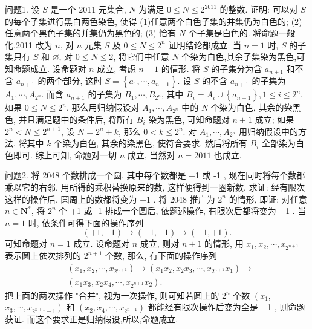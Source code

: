 
问题1. 设 $S$ 是一个 2011 元集合, $N$ 为满足 $0 \leqslant N \leqslant 2^{2011}$ 的整数.
证明: 可以对 $S$ 的每个子集进行黑白两色染色, 使得
(1)任意两个白色子集的并集仍为白色的;
(2)任意两个黑色子集的并集仍为黑色的;
(3) 恰有 $N$ 个子集是白色的.
将命题一般化,2011 改为 $n$, 对 $n$ 元集 $S$ 及 $0 \leqslant N \leqslant 2^n$ 证明结论都成立.
当 $n=1$ 时, $S$ 的子集只有 $S$ 和 $\varnothing$, 对 $0 \leqslant N \leqslant 2$, 将它们中任意 $N$ 个染为白色,其余子集染为黑色,可知命题成立.
设命题对 $n$ 成立, 考虑 $n+1$ 的情形.
将 $S$ 的子集分为含 $a_{n+1}$ 和不含 $a_{n+1}$ 的两个部分, 这时 $S=\left\{a_1, \cdots, a_{n+1}\right\}$. 设 $S$ 的不含 $a_{n+1}$ 的子集为 $A_1, \cdots, A_{2^n}$. 而含 $a_{n+1}$ 的子集为 $B_1, \cdots, B_{2^n}$, 其中 $B_i=A_i \cup\left\{a_{n+1}\right\}, 1 \leqslant i \leqslant 2^n$.
如果 $0 \leqslant N \leqslant 2^n$, 那么用归纳假设对 $A_1, \cdots, A_{2^n}$ 中的 $N$ 个染为白色, 其余的染黑色, 并且满足题中的条件后, 将所有 $B_i$ 染为黑色, 可知命题对 $n+1$ 成立; 如果 $2^n<N \leqslant 2^{n+1}$, 设 $N=2^n+k$, 那么 $0<k \leqslant 2^n$. 对 $A_1, \cdots, A_{2^n}$ 用归纳假设中的方法, 将其中 $k$ 个染为白色, 其余的染黑色, 使符合要求.
然后将所有 $B_i$ 全部染为白色即可.
综上可知, 命题对一切 $n$ 成立, 当然对 $n=2011$ 也成立.



问题2. 将 2048 个数排成一个圆, 其中每个数都是 +1 或 -1 , 现在同时将每个数都乘以它的右邻, 用所得的乘积替换原来的数, 这样便得到一圈新数.
求证: 经有限次这样的操作后, 圆周上的数都将变为 +1 .
将 2048 推广为 $2^n$ 的情形, 即证: 对任意 $n \in \mathbf{N}^*$, 将 $2^n$ 个 +1 或 -1 排成一个圆后, 依题述操作, 有限次后都将变为 +1 .
当 $n=1$ 时, 依条件可得下面的操作序列
$$
(+1,-1) \rightarrow(-1,-1) \rightarrow(+1,+1) .
$$
可知命题对 $n=1$ 成立.
设命题对 $n$ 成立, 则对 $n+1$ 的情形, 用 $x_1, x_2, \cdots, x_{2^{n+1}}$ 表示圆上依次排列的 $2^{n+1}$ 个数, 那么, 有下面的操作序列
$$
\begin{aligned}
& \left(x_1, x_2, \cdots, x_{2^{n+1}}\right) \rightarrow\left(x_1 x_2, x_2 x_3, \cdots, x_{2^{n+1}} x_1\right) \rightarrow \\
& \left(x_1 x_3, x_2 x_4, \cdots, x_{2^{n+1}} x_2\right) .
\end{aligned}
$$
把上面的两次操作 "合并", 视为一次操作, 则可知若圆上的 $2^n$ 个数 $\left(x_1\right.$, $\left.x_3, \cdots, x_{2^{n+1}-1}\right)$ 和 $\left(x_2, x_4, \cdots, x_{2^{n+1}}\right)$ 都能经有限次操作后变为全是 +1 , 则命题获证.
而这个要求正是归纳假设,所以,命题成立.



